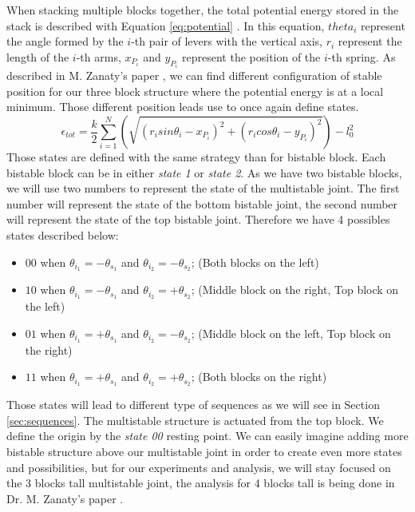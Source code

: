         When stacking multiple blocks together, the total potential energy stored in the stack is described with Equation \ref{eq:potential}  \cite{mo_main_paper}. In this equation, $theta_i$ represent the angle formed by the $i$-th pair of levers with the vertical axis, $r_i$ represent the length of the $i$-th arms, $x_{P_i}$ and $y_{P_i}$ represent the position of the $i$-th spring. As described in M. Zanaty's paper \cite{mo_main_paper}, we can find different configuration of stable position for our three block structure where the potential energy is at a local minimum. Those different position leads use to once again define states. 
        \begin{equation}
            \epsilon_{tot} = \frac{k}{2} \sum_{i=1}^{N}\left(\sqrt{(r_i sin \theta_i - x_{P_i})^2 + (r_i cos \theta_i - y_{P_i})^2} \right) - l_0^2
            \label{eq:potential}
        \end{equation}
        Those states are defined with the same strategy than for bistable block. Each bistable block can be in either \textit{state 1} or \textit{state 2}. As we have two bistable blocks, we will use two numbers to represent the state of the multistable joint. The first number will represent the state of the bottom bistable joint, the second number will represent the state of the top bistable joint. Therefore we have 4 possibles states described below: \\
        \begin{itemize}
            \item $00$ when $\theta_{i_1} = -\theta_{s_1}$ and $\theta_{i_2} = -\theta_{s_2}$; (Both blocks on the left)
            \item $10$ when $\theta_{i_1} = -\theta_{s_1}$ and $\theta_{i_2} = +\theta_{s_2}$; (Middle block on the right, Top block on the left)
            \item $01$ when $\theta_{i_1} = +\theta_{s_1}$ and $\theta_{i_2} = -\theta_{s_2}$; (Middle block on the left, Top block on the right)
            \item $11$ when $\theta_{i_1} = +\theta_{s_1}$ and $\theta_{i_2} = +\theta_{s_2}$; (Both blocks on the right)
        \end{itemize}
        
        Those states will lead to different type of sequences as we will see in Section \ref{sec:sequences}. The multistable structure is actuated from the top block. We define the origin by the \textit{state 00} resting point. We can easily imagine adding more bistable structure above our multistable joint in order to create even more states and possibilities, but for our experiments and analysis, we will stay focused on the 3 blocks tall multistable joint, the analysis for 4 blocks tall is being done in Dr. M. Zanaty's paper \cite{mo_main_paper}.
        
